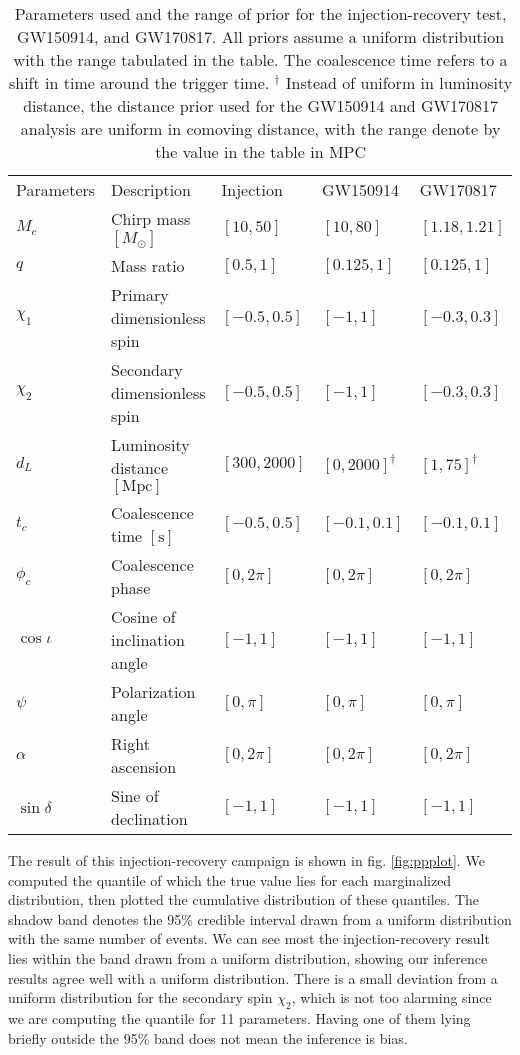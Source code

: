 \documentclass[twocolumn]{aastex631}
\begin{document}
\begin{table*}[hbt!]
    \begin{center}
    \begin{tabular}{ l l l l l }
    \hline
    \hline
    Parameters &  Description & Injection & GW150914 & GW170817\\

    $M_c$ & Chirp mass $[M_\odot]$& $[10, 50]$ & $[10,80]$ & $[1.18,1.21]$ \\
    $q$ & Mass ratio & $[0.5, 1]$ & $[0.125,1]$ & $[0.125,1]$ \\
    $\chi_1$ & Primary dimensionless spin& $[-0.5, 0.5]$ & $[-1,1]$ & $[-0.3,0.3]$ \\
    $\chi_2$ & Secondary dimensionless spin & $[-0.5, 0.5]$ & $[-1,1]$ & $[-0.3,0.3]$ \\
    $d_L$ & Luminosity distance $[\textrm{Mpc}]$ & $[300, 2000]$ & $[0, 2000]^\dag$ & $[1, 75]^\dag$ \\
    $t_c$ & Coalescence time $[\textrm{s}]$& $[-0.5, 0.5]$ & $[-0.1, 0.1]$ & $[-0.1, 0.1]$ \\
    $\phi_c$ & Coalescence phase & $[0, 2\pi]$ & $[0, 2\pi]$ & $[0, 2\pi]$ \\
    $\cos{\iota}$ & Cosine of inclination angle & $[-1, 1]$ & $[-1, 1]$ & $[-1, 1]$ \\
    $\psi$ & Polarization angle & $[0, \pi]$ & $[0, \pi]$ & $[0, \pi]$ \\
    $\alpha$ & Right ascension & $[0, 2\pi]$ & $[0, 2\pi]$ & $[0, 2\pi]$ \\
    $\sin{\delta}$ & Sine of declination & $[-1, 1]$ & $[-1, 1]$ & $[-1, 1]$ \\

    \hline
    \hline
    \end{tabular}
    \caption{Parameters used and the range of prior for the injection-recovery
    test, GW150914, and GW170817. All priors assume a uniform distribution with
    the range tabulated in the table. The coalescence time refers to a shift in
    time around the trigger time. $^\dag$ Instead of uniform in luminosity
    distance, the distance prior used for the GW150914 and GW170817 analysis are
    uniform in comoving distance, with the range denote by the value in the
    table in $\textrm{MPC}$}
    \label{tab:parameters}
    \end{center}
\end{table*}

The result of this injection-recovery campaign is shown in fig. \ref{fig:ppplot}. We
computed the quantile of which the true value lies for each marginalized
distribution, then plotted the cumulative distribution of these quantiles. The
shadow band denotes the 95\% credible interval drawn from a uniform distribution
with the same number of events. We can see most the injection-recovery result
lies within the band drawn from a uniform distribution, showing our inference
results agree well with a uniform distribution. There is a small deviation from
a uniform distribution for the secondary spin $\chi_2$, which is not too
alarming since we are computing the quantile for 11 parameters. Having one of
them lying briefly outside the 95\% band does not mean the inference is bias.
\end{document}
